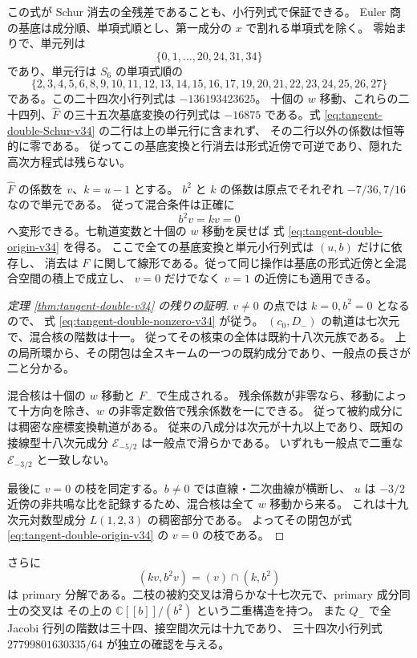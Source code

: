 この式が Schur 消去の全残差であることも、小行列式で保証できる。
Euler 商の基底は成分順、単項式順とし、第一成分の $x$ で割れる単項式を除く。
零始まりで、単元列は
\[
 \{0,1,\ldots,20,24,31,34\}
\]
であり、単元行は $S_6$ の単項式順の
\[
 \{2,3,4,5,6,8,9,10,11,12,13,14,15,16,17,19,20,21,22,23,24,25,26,27\}
\]
である。この二十四次小行列式は $-136193423625$。
十個の $w$ 移動、これらの二十四列、$\widehat F$ の三十五次基底変換の行列式は
$-16875$ である。式 \eqref{eq:tangent-double-Schur-v34} の二行は上の単元行に含まれず、
その二行以外の係数は恒等的に零である。
従ってこの基底変換と行消去は形式近傍で可逆であり、隠れた高次方程式は残らない。

$\widehat F$ の係数を $v$、$k=u-1$ とする。
$b^2$ と $k$ の係数は原点でそれぞれ $-7/36,7/16$ なので単元である。
従って混合条件は正確に
\[
 b^2v=kv=0
\]
へ変形できる。七軌道変数と十個の $w$ 移動を戻せば
式 \eqref{eq:tangent-double-origin-v34} を得る。
ここで全ての基底変換と単元小行列式は $(u,b)$ だけに依存し、
消去は $F$ に関して線形である。従って同じ操作は基底の形式近傍と全混合空間の積上で成立し、
$v=0$ だけでなく $v=1$ の近傍にも適用できる。

\begin{proof}[定理 \ref{thm:tangent-double-v34} の残りの証明]
$v\ne0$ の点では $k=0,b^2=0$ となるので、
式 \eqref{eq:tangent-double-nonzero-v34} が従う。
$(c_0,D_-)$ の軌道は七次元で、混合核の階数は十一。
従ってその核束の全体は既約十八次元族である。
上の局所環から、その閉包は全スキームの一つの既約成分であり、一般点の長さが二と分かる。

混合核は十個の $w$ 移動と $F_-$ で生成される。
残余係数が非零なら、移動によって十方向を除き、$w$ の非零定数倍で残余係数を一にできる。
従って被約成分には稠密な座標変換軌道がある。
従来の八成分は次元が十九以上であり、既知の接線型十八次元成分
$\mathcal E_{-5/2}$ は一般点で滑らかである。
いずれも一般点で二重な $\mathcal E_{-3/2}$ と一致しない。

最後に $v=0$ の枝を同定する。$b\ne0$ では直線・二次曲線が横断し、
$u$ は $-3/2$ 近傍の非共鳴な比を記録するため、混合核は全て $w$ 移動から来る。
これは十九次元対数型成分 $L(1,2,3)$ の稠密部分である。
よってその閉包が式 \eqref{eq:tangent-double-origin-v34} の $v=0$ の枝である。
\end{proof}

さらに
\[
 (kv,b^2v)=(v)\cap(k,b^2)
\]
は primary 分解である。二枝の被約交叉は滑らかな十七次元で、primary 成分同士の交叉は
その上の $\mathbb C[[b]]/(b^2)$ という二重構造を持つ。
また $Q_-$ で全 Jacobi 行列の階数は三十四、接空間次元は十九であり、
三十四次小行列式 $27799801630335/64$ が独立の確認を与える。


